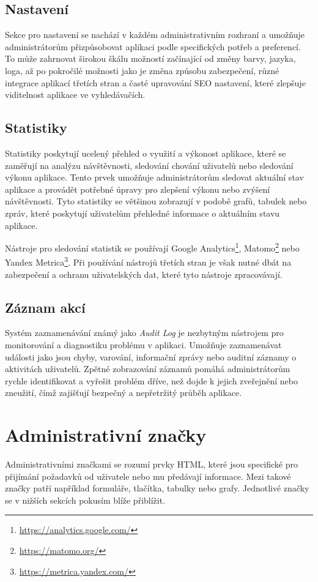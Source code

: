 \subsection{Nastavení}
\label{subsec:admin-elements-settings}
Sekce pro nastavení se nachází v každém administrativním rozhraní a umožňuje administrátorům přizpůsobovat aplikaci podle specifických potřeb a preferencí. To může zahrnovat širokou škálu možností začínající od změny barvy, jazyka, loga, až po pokročilé možnosti jako je změna způsobu zabezpečení, různé integrace aplikací třetích stran a časté upravování SEO nastavení, které zlepšuje viditelnost aplikace ve vyhledávačích.

\subsection{Statistiky}
\label{subsec:admin-elements-statistics}
Statistiky poskytují ucelený přehled o využití a výkonost aplikace, které se zaměřují na analýzu návštěvnosti, sledování chování uživatelů nebo sledování výkonu aplikace. Tento prvek umožňuje administrátorům sledovat aktuální stav aplikace a provádět potřebné úpravy pro zlepšení výkonu nebo zvýšení návštěvnosti. Tyto statistiky se většinou zobrazují v podobě grafů, tabulek nebo zpráv, které poskytují uživatelům přehledné informace o aktuálním stavu aplikace.

Nástroje pro sledování statistik se používají Google Analytics\footnote[4]{\url{https://analytics.google.com/}}, Matomo\footnote[5]{\url{https://matomo.org/}} nebo Yandex Metrica\footnote[6]{\url{https://metrica.yandex.com/}}. Při používání nástrojů třetích stran je však nutné dbát na zabezpečení a ochranu uživatelských dat, které tyto nástroje zpracovávají.

\subsection{Záznam akcí}
\label{subsec:admin-elements-logs}
Systém zaznamenávání známý jako \textit{Audit Log} je nezbytným nástrojem pro monitorování a diagnostiku problému v aplikaci. Umožňuje zaznamenávat události jako jsou chyby, varování, informační zprávy nebo auditní záznamy o aktivitách uživatelů. Zpětné zobrazování záznamů pomáhá administrátorům rychle identifikovat a vyřešit problém dříve, než dojde k jejich zveřejnění nebo zneužití, čímž zajišťují bezpečný a nepřetržitý průběh aplikace.

\section{Administrativní značky}
\label{sec:admin-tags}
Administrativními značkami se rozumí prvky HTML, které jsou specifické pro přijímání požadavků od uživatele nebo mu předávají informace. Mezi takové značky patří například formuláře, tlačítka, tabulky nebo grafy. Jednotlivé značky se v nižších sekcích pokusím blíže přiblížit.

